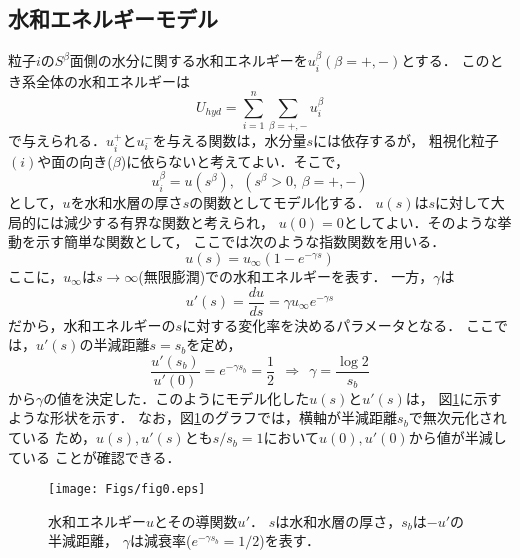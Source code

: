 \subsection{水和エネルギーモデル}
粒子$i$の$S^\beta$面側の水分に関する水和エネルギーを$u^\beta_i(\beta=+,-)$とする．
このとき系全体の水和エネルギーは
\begin{equation}
	U_{hyd}=\sum_{i=1}^n\sum_{\beta=+,-} u_i^{\beta}
	\label{eqn:}
\end{equation}
で与えられる．$u^+_i$と$u^-_i$を与える関数は，水分量$s$には依存するが，
粗視化粒子$(i)$や面の向き($\beta$)に依らないと考えてよい．そこで，
\begin{equation}
	u^\beta_i= u(s^\beta), \ \ (s^\beta>0,\, \beta=+,-)
	\label{eqn:}
\end{equation}
として，$u$を水和水層の厚さ$s$の関数としてモデル化する．
$u(s)$は$s$に対して大局的には減少する有界な関数と考えられ，
$u(0)=0$としてよい．そのような挙動を示す簡単な関数として，
ここでは次のような指数関数を用いる．
\begin{equation}
	u(s)=u_{\infty} \left(1-e^{-\gamma s} \right)
	\label{eqn:u_s}
\end{equation}
ここに，$u_{\infty}$は$s\rightarrow \infty$(無限膨潤)での水和エネルギーを表す．
一方，$\gamma$は
\begin{equation}
	u'(s)=\frac{du}{ds}=\gamma u_{\infty} e^{-\gamma s}
	\label{eqn:ud_s}
\end{equation}
だから，水和エネルギーの$s$に対する変化率を決めるパラメータとなる．
ここでは，$u'(s)$の半減距離$s=s_b$を定め，
\begin{equation}
	\frac{u'\left(s_b\right)}{u'(0)}=e^{-\gamma s_b}=\frac{1}{2} 
	\ \ \Rightarrow \ \
	\gamma=\frac{\log 2}{s_b}
	\label{eqn:}
\end{equation}
から$\gamma$の値を決定した．このようにモデル化した$u(s)$と$u'(s)$は，
図\ref{fig:fig0}に示すような形状を示す．
なお，図\ref{fig:fig0}のグラフでは，横軸が半減距離$s_b$で無次元化されている
ため，$u(s),u'(s)$とも$s/s_b=1$において$u(0),u'(0)$から値が半減している
ことが確認できる．
\begin{figure}[h]
	\begin{center}
	\texttt{[image: Figs/fig0.eps]} 
	\end{center}
	\caption{
		水和エネルギー$u$とその導関数$u'$．
		$s$は水和水層の厚さ，$s_b$は$-u'$の半減距離，
		$\gamma$は減衰率($e^{-\gamma s_b}=1/2$)を表す．
	} 
	\label{fig:fig0}
\end{figure}
